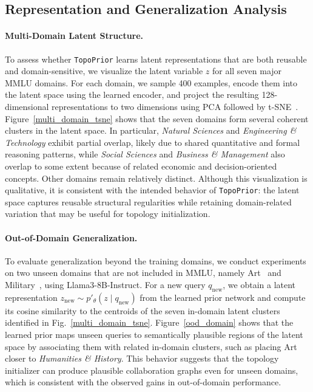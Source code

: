 \documentclass[lettersize,journal]{IEEEtran}
\theoremstyle{plain}
\begin{document}
\subsection{Representation and Generalization Analysis}

\paragraph{Multi-Domain Latent Structure.}
To assess whether \texttt{TopoPrior} learns latent representations that are both reusable and domain-sensitive, we visualize the latent variable $z$ for all seven major MMLU domains. For each domain, we sample 400 examples, encode them into the latent space using the learned encoder, and project the resulting 128-dimensional representations to two dimensions using PCA followed by t-SNE~\cite{tsne_bib}. Figure~\ref{multi_domain_tsne} shows that the seven domains form several coherent clusters in the latent space. In particular, \emph{Natural Sciences} and \emph{Engineering \& Technology} exhibit partial overlap, likely due to shared quantitative and formal reasoning patterns, while \emph{Social Sciences} and \emph{Business \& Management} also overlap to some extent because of related economic and decision-oriented concepts. Other domains remain relatively distinct. Although this visualization is qualitative, it is consistent with the intended behavior of \texttt{TopoPrior}: the latent space captures reusable structural regularities while retaining domain-related variation that may be useful for topology initialization.

\paragraph{Out-of-Domain Generalization.}
To evaluate generalization beyond the training domains, we conduct experiments on two unseen domains that are not included in MMLU, namely Art~\cite{DBLP:conf/eccv/GarciaV18} and Military~\cite{DBLP:conf/coling/Zhu0ZXWKH24}, using Llama3-8B-Instruct. For a new query $q_{\mathrm{new}}$, we obtain a latent representation $z_{\mathrm{new}}\sim p'_\theta(z\mid q_{\mathrm{new}})$ from the learned prior network and compute its cosine similarity to the centroids of the seven in-domain latent clusters identified in Fig.~\ref{multi_domain_tsne}. Figure~\ref{ood_domain} shows that the learned prior maps unseen queries to semantically plausible regions of the latent space by associating them with related in-domain clusters, such as placing Art closer to \emph{Humanities \& History}. This behavior suggests that the topology initializer can produce plausible collaboration graphs even for unseen domains, which is consistent with the observed gains in out-of-domain performance.
\end{document}
